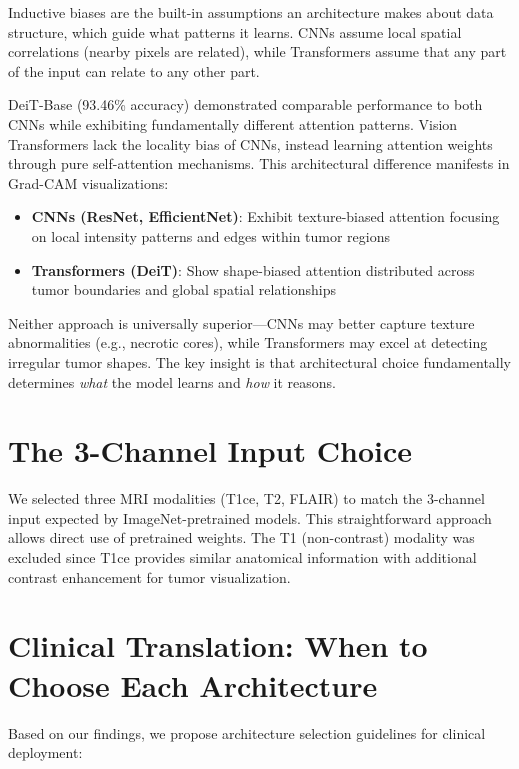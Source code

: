 Inductive biases are the built-in assumptions an architecture makes about data structure, which guide what patterns it learns. CNNs assume local spatial correlations (nearby pixels are related), while Transformers assume that any part of the input can relate to any other part.

DeiT-Base (93.46\% accuracy) demonstrated comparable performance to both CNNs while exhibiting fundamentally different attention patterns. Vision Transformers lack the locality bias of CNNs, instead learning attention weights through pure self-attention mechanisms. This architectural difference manifests in Grad-CAM visualizations:

\begin{itemize}
    \item \textbf{CNNs (ResNet, EfficientNet)}: Exhibit texture-biased attention focusing on local intensity patterns and edges within tumor regions
    \item \textbf{Transformers (DeiT)}: Show shape-biased attention distributed across tumor boundaries and global spatial relationships
\end{itemize}

Neither approach is universally superior---CNNs may better capture texture abnormalities (e.g., necrotic cores), while Transformers may excel at detecting irregular tumor shapes. The key insight is that architectural choice fundamentally determines \textit{what} the model learns and \textit{how} it reasons.

\section{The 3-Channel Input Choice}

We selected three MRI modalities (T1ce, T2, FLAIR) to match the 3-channel input expected by ImageNet-pretrained models. This straightforward approach allows direct use of pretrained weights. The T1 (non-contrast) modality was excluded since T1ce provides similar anatomical information with additional contrast enhancement for tumor visualization.

\section{Clinical Translation: When to Choose Each Architecture}

Based on our findings, we propose architecture selection guidelines for clinical deployment:


